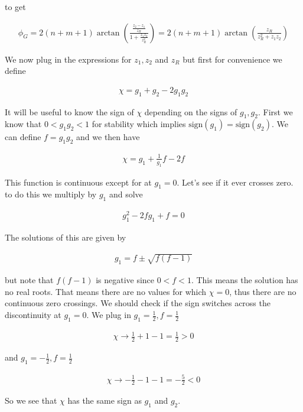 \documentclass[12pt]{article}
\begin{document}
to get

\begin{align}
\phi_G = 2(n+m+1)\arctan\left(\frac{\frac{z_2-z_1}{z_R}}{1+\frac{z_1 z_2}{z_R^2}}\right) = 2(n+m+1)\arctan\left(\frac{z_R}{z_R^2 + z_1z_2}\right)
\end{align}

We now plug in the expressions for $z_1, z_2$ and $z_R$ but first for convenience we define

\begin{align}
\chi = g_1 + g_2 - 2g_1g_2
\end{align}

It will be useful to know the sign of $\chi$ depending on the signs of $g_1, g_2$.
First we know that $0<g_1g_2<1$ for stability which implies $\text{sign}(g_1) = \text{sign}(g_2)$. 
We can define $f=g_1g_2$ and we then have

\begin{align}
\chi = g_1 + \frac{1}{g_1} f - 2f
\end{align}

This function is continuous except for at $g_1=0$.
Let's see if it ever crosses zero.
to do this we multiply by $g_1$ and solve

\begin{align}
g_1^2 -2f g_1 + f =0
\end{align}

The solutions of this are given by

\begin{align}
g_1 = f \pm \sqrt{f(f-1)}
\end{align}

but note that $f(f-1)$ is negative since $0<f<1$.
This means the solution has no real roots.
That means there are no values for which $\chi=0$, thus there are no continuous zero crossings.
We should check if the sign switches across the discontinuity at $g_1=0$.
We plug in $g_1=\frac{1}{2}, f=\frac{1}{2}$

\begin{align}
\chi \rightarrow \frac{1}{2} + 1 - 1 = \frac{1}{2}>0
\end{align}

and $g_1 = -\frac{1}{2}, f=\frac{1}{2}$

\begin{align}
\chi \rightarrow -\frac{1}{2} - 1 - 1 = -\frac{5}{2}<0
\end{align}

So we see that $\chi$ has the same sign as $g_1$ and $g_2$.
\end{document}
